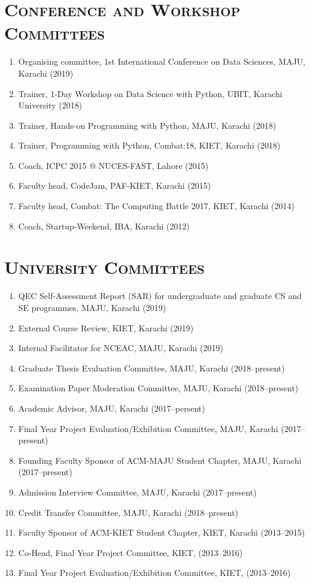 \documentclass[a4paper, 10pt]{article}
\begin{document}
\section*{\normalfont\textsc{Conference and Workshop Committees}}
\begin{enumerate}
\itemsep-4pt
\item Organising committee, 1st International Conference on Data Sciences, MAJU, Karachi (2019)
\item Trainer, 1-Day Workshop on Data Science with Python, UBIT, Karachi University (2018)
\item  Trainer, Hands-on Programming with Python, MAJU, Karachi (2018)
\item  Trainer, Programming with Python, Combat:18, KIET, Karachi (2018)
\item  Coach, ICPC 2015 @ NUCES-FAST, Lahore (2015)
\item  Faculty head, CodeJam, PAF-KIET, Karachi (2015)
\item  Faculty head, Combat: The Computing Battle 2017, KIET, Karachi (2014)
\item  Coach, Startup-Weekend, IBA, Karachi (2012)
\end{enumerate}

\section*{\normalfont\textsc{University Committees}}
\begin{enumerate}
\itemsep-4pt 
\item QEC Self-Assessment Report (SAR) for undergraduate and graduate CS and SE programmes, MAJU, Karachi (2019)
\item External Course Review, KIET, Karachi (2019)
\item Internal Facilitator for NCEAC, MAJU, Karachi (2019)
\item Graduate Thesis Evaluation Committee, MAJU, Karachi (2018--present)
\item Examination Paper Moderation Committee, MAJU, Karachi (2018--present)
\item Academic Advisor, MAJU, Karachi (2017--persent)
\item Final Year Project Evaluation/Exhibition Committee, MAJU, Karachi (2017--present)
\item Founding Faculty Sponsor of ACM-MAJU Student Chapter, MAJU, Karachi (2017--present)
\item Admission Interview Committee, MAJU, Karachi (2017--present)
\item Credit Transfer Committee, MAJU, Karachi (2018--present)
\item Faculty Sponsor of ACM-KIET Student Chapter, KIET, Karachi (2013--2015)
\item Co-Head, Final Year Project Committee, KIET, (2013--2016)
\item Final Year Project Evaluation/Exhibition Committee, KIET, (2013--2016)
\end{enumerate}
\end{document}
